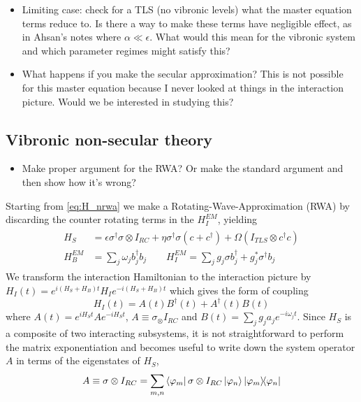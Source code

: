 \documentclass[]{article}
\begin{document}
\begin{itemize}
	\item Limiting case: check for a TLS (no vibronic levels) what the master equation terms reduce to. Is there a way to make these terms have negligible effect, as in Ahsan's notes where $\alpha\ll \epsilon$. What would this mean for the vibronic system and which parameter regimes might satisfy this?
	\item What happens if you make the secular approximation? This is not possible for this master equation because I never looked at things in the interaction picture. Would we be interested in studying this?
\end{itemize}
\subsection{Vibronic non-secular theory}
\label{ssec:nsec}
\begin{itemize}
	\item Make proper argument for the RWA? Or make the standard argument and then show how it's wrong?
\end{itemize}
Starting from \ref{eq:H_nrwa} we make a Rotating-Wave-Approximation (RWA) by discarding the counter rotating terms in the $H^{EM}_I$, yielding
\begin{align}
	\begin{split}
		H_S &= \epsilon \sigma^{\dagger}\sigma\otimes I_{RC} + \eta\sigma^{\dagger}\sigma(c + c^{\dagger}) + \Omega ( I_{TLS}\otimes c^{\dagger}c) \\
		H_B^{EM} &= \sum_{j}\omega_j b^{\dagger}_j b_j \quad \quad H_I^{EM} = \sum_{j}g_j\sigma b^{\dagger}_j+ g_j^*\sigma^{\dagger} b_j 
	\end{split}
\end{align}
We transform the interaction Hamiltonian to the interaction picture by $H_I(t) = e^{i(H_S+H_B) t}H_I e^{-i (H_S+H_B)t}$ which gives the form of coupling
\begin{equation}
\label{eq:IDecomposition}
H_I(t) = A(t) B^{\dagger}(t) + A^{\dagger}(t) B(t)  
\end{equation}
where $A(t) = e^{iH_S t}Ae^{-i H_S t}$, $A \equiv\sigma_\otimes I_{RC}$ and $B(t)= \sum_{j}g_ja_je^{-i\omega_j t}$. Since $H_S$ is a composite of two interacting subsystems, it is not straightforward to perform the matrix exponentiation and becomes useful to write down the system operator $A$ in terms of the eigenstates of $H_S$,
\begin{equation}
A \equiv \sigma\otimes I_{RC} = \sum_{m,n} \bra{\varphi_m}\sigma\otimes I_{RC}\ket{\varphi_n}\dyad{\varphi_m}{\varphi_n}
\end{equation}
\end{document}
